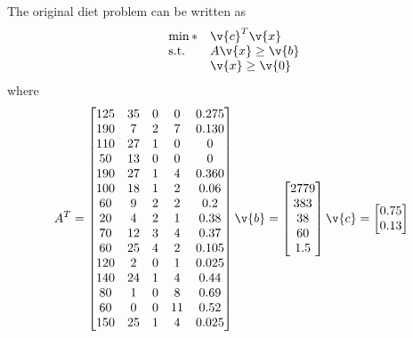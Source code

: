 \documentclass[11pt, oneside]{article}
\begin{document}
\begin{enumerate}
        The original diet problem can be written as
        \[
            \begin{array}{ll@{}ll}
                \min* & \v{c}^T \v{x} \\
                \text{s.t.} & A\v{x} \ge \v{b} \\
                            & \v{x} \ge \v{0}
            \end{array}
        \]
        where
        \begin{align*}
            A^T =
            \begin{bmatrix}
                125 & 35 & 0 &  0 & 0.275 \\ %
                190 &  7 & 2 &  7 & 0.130 \\ %
                110 & 27 & 1 &  0 &     0 \\ %
                 50 & 13 & 0 &  0 &     0 \\ %
                190 & 27 & 1 &  4 & 0.360 \\ %
                100 & 18 & 1 &  2 &  0.06 \\ %
                 60 &  9 & 2 &  2 &   0.2 \\ %
                 20 &  4 & 2 &  1 &  0.38 \\ %
                 70 & 12 & 3 &  4 &  0.37 \\ %
                 60 & 25 & 4 &  2 & 0.105 \\ %
                120 &  2 & 0 &  1 & 0.025 \\ %
                140 & 24 & 1 &  4 &  0.44 \\ %
                 80 &  1 & 0 &  8 &  0.69 \\ %
                 60 &  0 & 0 & 11 &  0.52 \\ %
                150 & 25 & 1 &  4 & 0.025    %
            \end{bmatrix}
            \v{b} =
            \begin{bmatrix}
                2779 \\
                 383 \\
                  38 \\
                  60 \\
                 1.5
            \end{bmatrix}
            \v{c} =
            \begin{bmatrix}
                0.75 \\ %
                0.13 \\ %

\end{bmatrix}
\end{align*}
\end{enumerate}
\end{document}
